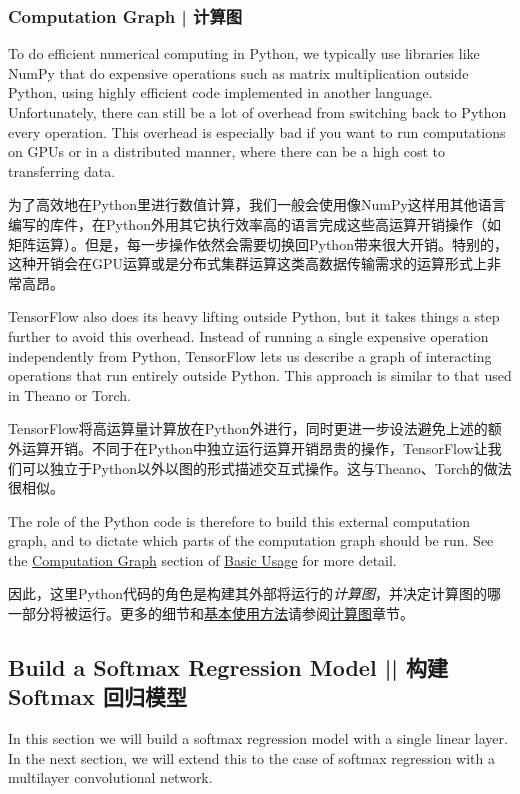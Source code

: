 \subsubsection {Computation Graph  |  计算图}

To do efficient numerical computing in Python, we typically use libraries like NumPy that do expensive operations such as matrix multiplication outside Python, using highly efficient code implemented in another language. Unfortunately, there can still be a lot of overhead from switching back to Python every operation. This overhead is especially bad if you want to run computations on GPUs or in a distributed manner, where there can be a high cost to transferring data.

为了高效地在Python里进行数值计算，我们一般会使用像NumPy这样用其他语言编写的库件，在Python外用其它执行效率高的语言完成这些高运算开销操作（如矩阵运算）。但是，每一步操作依然会需要切换回Python带来很大开销。特别的，这种开销会在GPU运算或是分布式集群运算这类高数据传输需求的运算形式上非常高昂。

TensorFlow also does its heavy lifting outside Python, but it takes things a step further to avoid this overhead. Instead of running a single expensive operation independently from Python, TensorFlow lets us describe a graph of interacting operations that run entirely outside Python. This approach is similar to that used in Theano or Torch.

TensorFlow将高运算量计算放在Python外进行，同时更进一步设法避免上述的额外运算开销。不同于在Python中独立运行运算开销昂贵的操作，TensorFlow让我们可以独立于Python以外以图的形式描述交互式操作。这与Theano、Torch的做法很相似。

The role of the Python code is therefore to build this external computation graph, and to dictate which parts of the computation graph should be run. See the \hyperref[computation_graph]{Computation Graph} section of \hyperref[basic_usage]{Basic Usage} for more detail.

因此，这里Python代码的角色是构建其外部将运行的\emph{计算图}，并决定计算图的哪一部分将被运行。更多的细节和\hyperref[basic_usage]{基本使用方法}请参阅\hyperref[computation_graph]{计算图}章节。

%
\subsection{Build a Softmax Regression Model  ||  构建 Softmax 回归模型}

In this section we will build a softmax regression model with a single linear layer. In the next section, we will extend this to the case of softmax regression with a multilayer convolutional network.

